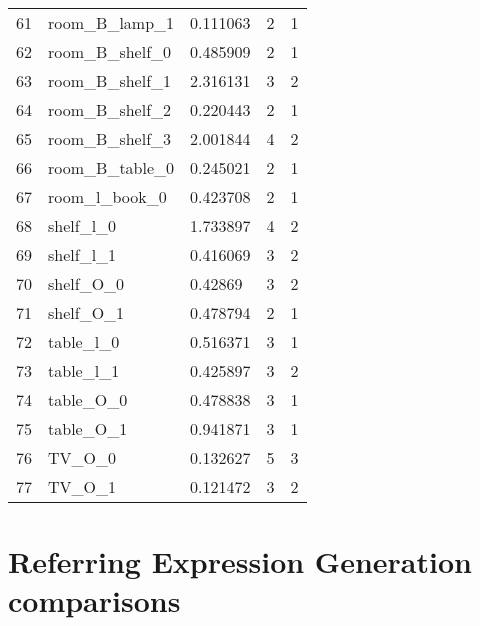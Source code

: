 \begin{longtable}{@{\zz\extracolsep{\fill}} l|llll}
61 & room\_B\_lamp\_1         & 0.111063 & 2 & 1 \\
62 & room\_B\_shelf\_0        & 0.485909 & 2 & 1 \\
63 & room\_B\_shelf\_1        & 2.316131 & 3 & 2 \\
64 & room\_B\_shelf\_2        & 0.220443 & 2 & 1 \\
65 & room\_B\_shelf\_3        & 2.001844 & 4 & 2 \\
66 & room\_B\_table\_0        & 0.245021 & 2 & 1 \\
67 & room\_l\_book\_0         & 0.423708 & 2 & 1 \\
68 & shelf\_l\_0              & 1.733897 & 4 & 2 \\
69 & shelf\_l\_1              & 0.416069 & 3 & 2 \\
70 & shelf\_O\_0              & 0.42869  & 3 & 2 \\
71 & shelf\_O\_1              & 0.478794 & 2 & 1 \\
72 & table\_l\_0              & 0.516371 & 3 & 1 \\
73 & table\_l\_1              & 0.425897 & 3 & 2 \\
74 & table\_O\_0              & 0.478838 & 3 & 1 \\
75 & table\_O\_1              & 0.941871 & 3 & 1 \\
76 & TV\_O\_0                 & 0.132627 & 5 & 3 \\
77 & TV\_O\_1                 & 0.121472 & 3 & 2 \\ \cline{1-4}
\end{longtable}

\section{Referring Expression Generation comparisons}

